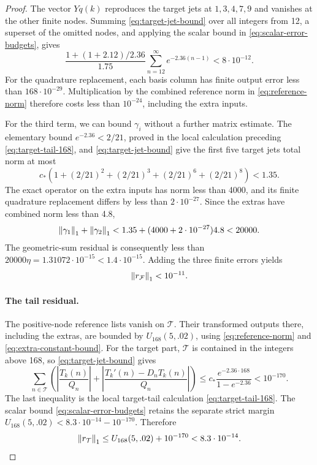 \begin{proof}
The vector \(Yq(k)\) reproduces the target jets at \(1,3,4,7,9\) and vanishes
at the other finite nodes.  Summing \eqref{eq:target-jet-bound} over all
integers from 12, a superset of the omitted nodes, and applying the scalar
bound in \eqref{eq:scalar-error-budgets}, gives
\begin{equation}
 \frac{1+(1+2.12)/2.36}{1.75}
 \sum_{n=12}^{\infty}e^{-2.36(n-1)}<8\cdot10^{-12}.
 \label{eq:omitted-target-jets}
\end{equation}
For the quadrature replacement, each basis column has finite output error
less than \(168\cdot10^{-29}\).  Multiplication by the combined reference
norm in \eqref{eq:reference-norm} therefore costs less than \(10^{-24}\),
including the extra inputs.

For the third term, we can bound \(\gamma_i\) without a further matrix
estimate.  The elementary
bound \(e^{-2.36}<2/21\), proved in the local calculation preceding
\eqref{eq:target-tail-168}, and \eqref{eq:target-jet-bound} give the first
five target jets total norm at most
\[
 c_*\left(1+(2/21)^2+(2/21)^3+(2/21)^6+(2/21)^8\right)<1.35.
\]
The exact operator on the extra inputs has norm less than 4000, and its finite
quadrature replacement differs by less than \(2\cdot10^{-27}\).  Since the
extras have combined norm less than 4.8,
\[
 \left\lVert\gamma_1\right\rVert_1+\left\lVert\gamma_2\right\rVert_1
 <1.35+(4000+2\cdot10^{-27})4.8<20000.
\]
The geometric-sum residual is consequently less than
\(20000\eta=1.31072\cdot10^{-15}<1.4\cdot10^{-15}\).  Adding the three
finite errors yields
\begin{equation}
 \left\lVert r_{\mathcal F}\right\rVert_1<10^{-11}.
 \label{eq:finite-reference-residual}
\end{equation}

\paragraph{The tail residual.}
The positive-node reference lists vanish on \(\mathcal T\).  Their
transformed outputs there, including the extras, are bounded by
\(U_{168}(5,.02)\), using \eqref{eq:reference-norm} and
\eqref{eq:extra-constant-bound}.  For the target part, \(\mathcal T\) is
contained in the integers above 168, so \eqref{eq:target-jet-bound} gives
\[
 \sum_{n\in\mathcal T}
 \left(\left|\frac{T_k(n)}{Q_n}\right|
 +\left|\frac{T_k'(n)-D_nT_k(n)}{Q_n}\right|\right)
 \le c_*\frac{e^{-2.36\cdot168}}{1-e^{-2.36}}
 <10^{-170}.
\]
The last inequality is the local target-tail calculation
\eqref{eq:target-tail-168}.  The scalar bound
\eqref{eq:scalar-error-budgets} retains the separate strict margin
\(U_{168}(5,.02)<8.3\cdot10^{-14}-10^{-170}\).  Therefore
\begin{equation}
 \left\lVert r_{\mathcal T}\right\rVert_1
 \le U_{168}(5,.02)+10^{-170}<8.3\cdot10^{-14}.
 \label{eq:tail-reference-residual}
\end{equation}


\end{proof}
